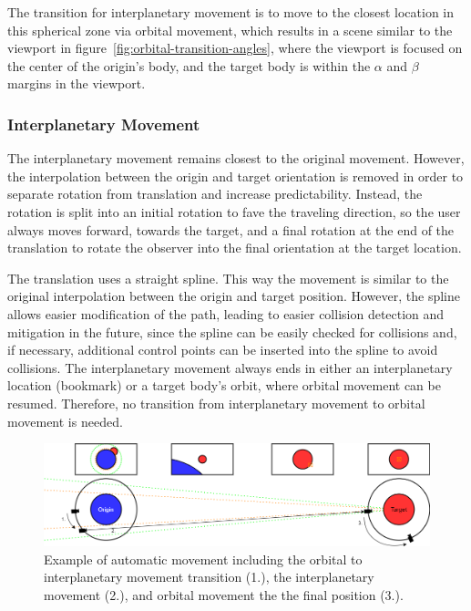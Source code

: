 The transition for interplanetary movement is to move to the closest location in this spherical zone via orbital
movement, which results in a scene similar to the viewport in figure~\ref{fig:orbital-transition-angles}, where the
viewport is focused on the center of the origin's body, and the target body is within the $\alpha$ and $\beta$
margins in the viewport.

\subsubsection{Interplanetary Movement}\label{subsubsec:interplanetary-movement}

The interplanetary movement remains closest to the original movement.
However, the interpolation between the origin and target orientation is removed in order to separate rotation from
translation and increase predictability.
Instead, the rotation is split into an initial rotation to fave the traveling direction, so the user always moves
forward, towards the target, and a final rotation at the end of the translation to rotate the observer into the final
orientation at the target location.

The translation uses a straight spline.
This way the movement is similar to the original interpolation between the origin and target position.
However, the spline allows easier modification of the path, leading to easier collision detection and mitigation in
the future, since the spline can be easily checked for collisions and, if necessary, additional control points can be
inserted into the spline to avoid collisions.
The interplanetary movement always ends in either an interplanetary location (bookmark) or a target body's orbit,
where orbital movement can be resumed.
Therefore, no transition from interplanetary movement to orbital movement is needed.

\begin{figure}[h]
    \centering
    \includegraphics[width=\textwidth]{content/4_3_autoNavigation/img/Orbit2OrbitExample}
    \caption{Example of automatic movement including the orbital to interplanetary movement transition (1.), the
    interplanetary movement (2.), and orbital movement the the final position (3.).}
    \label{fig:orbital-example}
\end{figure}

